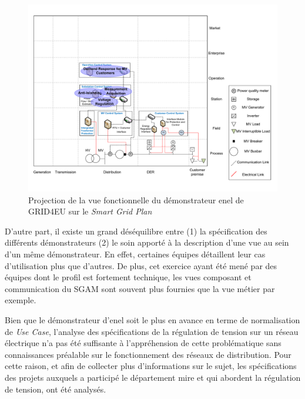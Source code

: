 \begin{figure}[!ht]
    \begin{center}
     \includegraphics[trim=0cm 1cm 0cm 1cm, width=1\textwidth]{figures/4_demarche/enel.pdf}
    \end{center}
    \caption{Projection de la vue fonctionnelle du démonstrateur \gls{enel} de
GRID4EU sur le \textit{Smart Grid Plan}} \label{fig:enel_sgplan}
\end{figure}

D'autre part, il existe un grand déséquilibre entre (1) la spécification des
différents démonstrateurs (2) le soin apporté à la description d'une vue au sein
d'un même démonstrateur. En effet, certaines équipes détaillent leur cas
d'utilisation plus que d'autres.
De plus, cet exercice ayant été mené par des équipes dont le profil est
fortement technique, les vues composant et communication du SGAM sont souvent
plus fournies que la vue métier par exemple.

Bien que le démonstrateur d'\gls{enel} soit le plus en avance en terme de
normalisation de \textit{Use Case}, l'analyse des spécifications de la
régulation de tension sur un réseau électrique n'a pas été suffisante à
l'appréhension de cette problématique sans connaissances préalable sur le
fonctionnement des réseaux de distribution. Pour cette raison, et afin de
collecter plus d'informations sur le sujet, les spécifications des projets
auxquels a participé le département \gls{mire} et qui abordent la régulation de
tension, ont été analysés.


